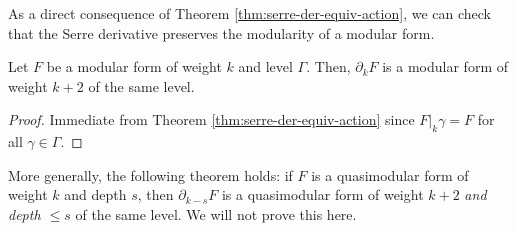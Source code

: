 As a direct consequence of Theorem \ref{thm:serre-der-equiv-action}, we can check that the Serre derivative preserves the modularity of a modular form.
\begin{theorem}\label{thm:serre-der-modularity}\leanok
Let $F$ be a modular form of weight $k$ and level $\Gamma$.
Then, $\partial_{k}F$ is a modular form of weight $k + 2$ of the same level.
\end{theorem}
\begin{proof}
    \leanok
    Immediate from Theorem \ref{thm:serre-der-equiv-action} since $F|_k\gamma = F$ for all $\gamma \in \Gamma$.
\end{proof}

\begin{remark}
More generally, the following theorem holds: if $F$ is a quasimodular form of weight $k$ and depth $s$, then $\partial_{k-s}F$ is a quasimodular form of weight $k + 2$ \emph{and depth $\le s$} of the same level. We will not prove this here.
\end{remark}

